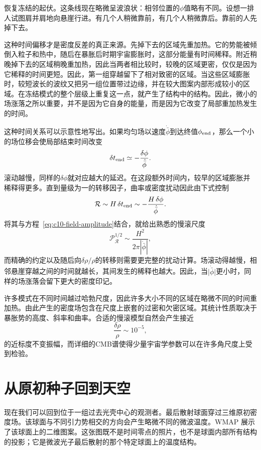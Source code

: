 恢复冻结的起伏。这条线现在略微呈波浪状：相邻位置的\(\phi\)值略有不同。设想一排人试图肩并肩地向悬崖行进。有几个人稍微靠前，有几个人稍微靠后。靠前的人先掉下去。

这种时间偏移才是密度反差的真正来源。先掉下去的区域先重加热。它的势能被倾倒入粒子和热中，随后在暴胀后时期宇宙膨胀时，这部分能量有时间稀释。附近稍晚掉下去的区域稍晚重加热，因此当两者相比较时，较晚的区域更密，仅仅是因为它稀释的时间更短。因此，第一组穿越留下了相对致密的区域。当这些区域膨胀时，较短波长的波纹又把另一组位置带过边缘，并在较大图案内部形成较小的区域。在冻结模式的整个层级上重复这一点，就产生了结构中的结构。因此，微小的场涨落之所以重要，并不是因为它自身的能量，而是因为它改变了局部重加热发生的时间。

这种时间关系可以示意性地写出。如果均匀场以速度\(\dot{\bar\phi}\)到达终值\(\phi_{\rm end}\)，那么一个小的场位移会使局部结束时间改变
\begin{equation}
\delta t_{\rm end}
\simeq-\frac{\delta\phi}{\dot{\bar\phi}}.
\label{eq:c10-time-delay}
\end{equation}
滚动越慢，同样的\(\delta\phi\)就对应越大的延迟。在这段额外时间内，较早的区域膨胀并稀释得更多。直到量级为一的转移因子，曲率或密度扰动因此由下式控制
\begin{equation}
\mathcal R
\sim H\,\delta t_{\rm end}
\sim-\frac{H\,\delta\phi}{\dot{\bar\phi}}.
\label{eq:c10-curvature-estimate}
\end{equation}
将其与方程~\eqref{eq:c10-field-amplitude}结合，就给出熟悉的慢滚尺度
\begin{equation}
\mathcal P_{\mathcal R}^{1/2}
\sim\frac{H^2}{2\pi|\dot{\bar\phi}|},
\label{eq:c10-slow-roll-amplitude}
\end{equation}
而精确的约定以及随后向\(\delta\rho/\rho\)的转移则需要更完整的扰动计算。场滚动得越慢，相邻悬崖穿越之间的时间就越长，其间发生的稀释也越大。因此，当\(\lvert\dot{\bar\phi}\rvert\)更小时，同样的场涨落会留下更大的密度印记。

许多模式在不同时间越过哈勃尺度，因此许多大小不同的区域在略微不同的时间重加热。由此产生的密度场包含在尺度上嵌套的过密和欠密区域。其统计性质取决于暴胀势的高度、斜率和曲率。合适的慢滚模型自然会产生接近
\[
\frac{\delta\rho}{\rho}\sim10^{-5},
\]
的近标度不变振幅，而详细的CMB谱使得少量宇宙学参数可以在许多角尺度上受到检验。

\section{从原初种子回到天空}

现在我们可以回到位于一组过去光壳中心的观测者。最后散射球面穿过三维原初密度场。该球面与不同引力势相交的方向会产生略微不同的微波温度。WMAP 展示了该球面上的二维图案。这张图既不是时间零点的照片，也不是球面内部所有结构的投影；它是微波光子最后散射的那个特定球面上的温度结构。

